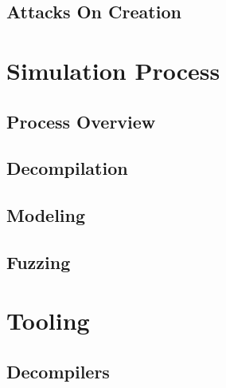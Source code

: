 \chapter{Attacks On Creation} \label{ch:case-studies-creation}



\part{Simulation Process} \label{sec:simulation-process}
\chapter{Process Overview} \label{ch:process-overview}

\chapter{Decompilation} \label{ch:decompilation}

\chapter{Modeling} \label{ch:modeling}

\chapter{Fuzzing} \label{ch:fuzzing}



\part{Tooling} \label{sec:evasion}
\chapter{Decompilers} \label{ch:decompilers}

